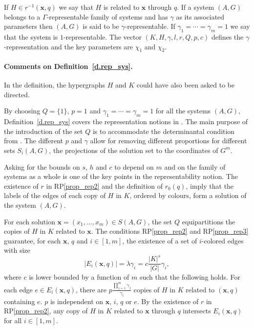 \documentclass[10pt]{article}
\begin{document}
If $H\in r^{-1}(\mathbf{x},q)$ we say that $H$ is related to $\mathbf{x}$ through $q$. 
If a system $(A,G)$ belongs to a $\Gamma$-representable family of systems and has $\gamma$ as its associated parameters then $(A,G)$ is said to be $\gamma$-representable. If $\gamma_1=\cdots=\gamma_m=1$ we say that the system is $1$-representable. The vector $(K,H,\gamma,l,r,Q,p,c)$ defines the $\gamma$-representation and the key parameters are $\chi_1$ and $\chi_2$.





\paragraph{Comments on Definition~\ref{d.rep_sys}.} \label{s.rep_oper_def}
In the definition, the hypergraphs $H$ and $K$ could have also been asked to be directed.

By choosing $Q=\{1\}$, $p=1$ and $\gamma_1=\cdots=\gamma_m=1$ for all the systems $(A,G)$, Definition~\ref{d.rep_sys} covers the representation notions in \cite{kraserven09,ksv13,kraserven12,sha10}. 
The main purpose of the introduction of the set $Q$ is to accommodate the determinantal condition from \cite[Theorem~1]{ksv13}. The different $p$ and $\gamma$ allow for removing different proportions for different sets $S_i(A,G)$, the projections of the solution set to the coordinates of $G^m$.


Asking for the bounds on $s$, $h$ and $c$ to depend on $m$ and on the family of systems as a whole is one of the key points in the representability notion. 
	The existence of $r$ in RP\ref{prop_rep2} and the definition of $r_0(q)$, imply that the labels of the edges of each copy of $H$ in $K$, ordered by colours, form a solution of the system $(A,G)$. 

For each solution $\mathbf{x}=(x_1,\ldots,x_m)\in S(A,G)$, the set $Q$ equipartitions the copies of $H$ in $K$ related to $\mathbf{x}$. The conditions RP\ref{prop_rep2} and RP\ref{prop_rep3} guarantee, for each $\mathbf{x}$, $q$ and $i\in[1,m]$, the existence of a set of $i$-colored edges with size
	 \begin{displaymath}
	 	|E_i(\mathbf{x},q)|=\lambda \gamma_i=c\frac{|K|^s}{|G|} \gamma_i,
	 \end{displaymath}
where $c$ is lower bounded by a function of $m$ such that the following holds. For each edge $e\in E_i(\mathbf{x},q)$, there are $p \frac{\prod_{j=1}^m \gamma_j}{\gamma_i}$ copies of $H$ in $K$ related to $(\mathbf{x},q)$ containing $e$. $p$ is independent on $\mathbf{x}$, $i$, $q$ or $e$. By the existence of $r$ in RP\ref{prop_rep2}, any copy of $H$ in $K$ related to $\mathbf{x}$ through $q$ intersects $E_i(\mathbf{x},q)$ for all $i\in [1,m]$.
	
\end{document}
